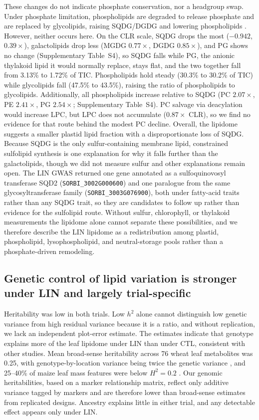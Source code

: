 \documentclass[9pt,twocolumn,twoside]{rilabRxiv}
\begin{document}
These changes do not indicate phosphate conservation, nor a headgroup swap. Under phosphate limitation, phospholipids are degraded to release phosphate and are replaced by glycolipids, raising SQDG/DGDG and lowering phospholipids \citep{Essigmann1998, Hartel2000, Jouhet2004, KellyDormann2002, Pfaff2020}. However, neither occurs here. On the CLR scale, SQDG drops the most ($-0.942$, $0.39\times$), galactolipids drop less (MGDG $0.77\times$, DGDG $0.85\times$), and PG shows no change (Supplementary Table~S4), so SQDG falls while PG, the anionic thylakoid lipid it would normally replace, stays flat, and the two together fall from 3.13\% to 1.72\% of TIC. Phospholipids hold steady (30.3\% to 30.2\% of TIC) while glycolipids fall (47.5\% to 43.5\%), raising the ratio of phospholipids to glycolipids. Additionally, all phospholipids increase relative to SQDG (PC $2.07\times$, PE $2.41\times$, PG $2.54\times$; Supplementary Table~S4). PC salvage via deacylation would increase LPC, but LPC does not accumulate ($0.87\times$ CLR), so we find no evidence for that route behind the modest PC decline. Overall, the lipidome suggests a smaller plastid lipid fraction with a disproportionate loss of SQDG. Because SQDG is the only sulfur-containing membrane lipid, constrained sulfolipid synthesis is one explanation for why it falls further than the galactolipids, though we did not measure sulfur and other explanations remain open. The LIN GWAS returned one gene annotated as a sulfoquinovosyl transferase SQD2 (\texttt{SORBI\_3002G000600}) and one paralogue from the same glycosyltransferase family (\texttt{SORBI\_3003G076900}), both under fatty-acid traits rather than any SQDG trait, so they are candidates to follow up rather than evidence for the sulfolipid route. Without sulfur, chlorophyll, or thylakoid measurements the lipidome alone cannot separate these possibilities, and we therefore describe the LIN lipidome as a redistribution among plastid, phospholipid, lysophospholipid, and neutral-storage pools rather than a phosphate-driven remodeling.


\subsection*{Genetic control of lipid variation is stronger under LIN and largely trial-specific}

Heritability was low in both trials. Low $h^2$ alone cannot distinguish low genetic variance from high residual variance because it is a ratio, and without replication, we lack an independent plot-error estimate. The estimates indicate that genotype explains more of the leaf lipidome under LIN than under CTL, consistent with other studies. Mean broad-sense heritability across 76 wheat leaf metabolites was 0.25, with genotype-by-location variance being twice the genetic variance \citep{Matros2017}, and 25–40\% of maize leaf mass features were below $H^2=0.2$ \citep{Zhou2019}. Our genomic heritabilities, based on a marker relationship matrix, reflect only additive variance tagged by markers and are therefore lower than broad-sense estimates from replicated designs. Ancestry explains little in either trial, and any detectable effect appears only under LIN.
\end{document}
